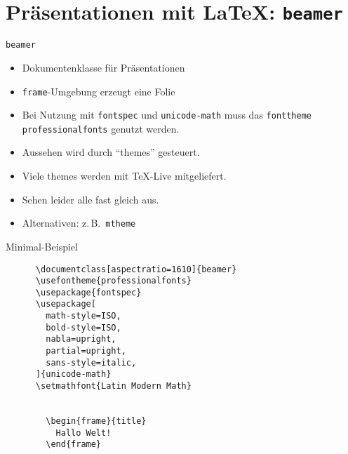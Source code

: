 \section{Präsentationen mit \LaTeX: \texttt{beamer}}

\begin{frame}[fragile]{
  \texttt{beamer}
  \hfill
}
  \begin{itemize}
    \item Dokumentenklasse für Präsentationen
    \item \lstinline+frame+-Umgebung erzeugt eine Folie
    \item Bei Nutzung mit \lstinline+fontspec+ und \lstinline+unicode-math+ muss das \texttt{fonttheme} \texttt{professionalfonts} genutzt werden.
    \item Aussehen wird durch \enquote{themes} gesteuert.
    \item Viele themes werden mit \TeX-Live mitgeliefert.
    \item Sehen leider alle fast gleich aus.
    \item Alternativen: z.\,B.~\texttt{mtheme}
  \end{itemize}
\end{frame}

\begin{frame}[fragile]{Minimal-Beispiel}
  \begin{center}
    \begin{lstlisting}
      \documentclass[aspectratio=1610]{beamer}
      \usefontheme{professionalfonts}
      \usepackage{fontspec}
      \usepackage[
        math-style=ISO,
        bold-style=ISO,
        nabla=upright,
        partial=upright,
        sans-style=italic,
      ]{unicode-math}
      \setmathfont{Latin Modern Math}

      
        \begin{frame}{title}
          Hallo Welt!
        \end{frame}
      
    \end{lstlisting}
  \end{center}
\end{frame}

